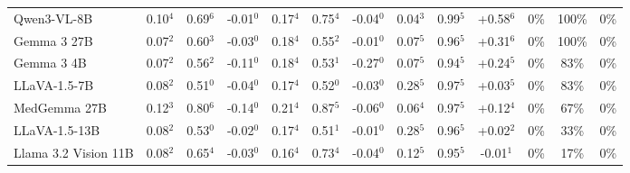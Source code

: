 \documentclass{article}
\begin{document}
\begin{table}[t]
{\begin{tabular}{l@{\hspace{3pt}}ccc@{\hspace{4pt}}ccc@{\hspace{4pt}}ccc@{\hspace{4pt}}ccc}
Qwen3-VL-8B & \cellcolor{cfSage2}0.10$^{4}$ & \cellcolor{cfSage2}0.69$^{6}$ & \cellcolor{cfSlate1}-0.01$^{0}$ & \cellcolor{cfSage3}0.17$^{4}$ & \cellcolor{cfSage2}0.75$^{4}$ & \cellcolor{cfSlate2}-0.04$^{0}$ & \cellcolor{cfSage1}0.04$^{3}$ & \cellcolor{cfSage4}0.99$^{5}$ & \cellcolor{cfTerra4}+0.58$^{6}$ & \cellcolor{cfTerra1}0\% & \cellcolor{cfTerra4}100\% & 0\% \\
Gemma 3 27B & \cellcolor{cfSage2}0.07$^{2}$ & \cellcolor{cfSage2}0.60$^{3}$ & \cellcolor{cfSlate2}-0.03$^{0}$ & \cellcolor{cfSage3}0.18$^{4}$ & \cellcolor{cfSage1}0.55$^{2}$ & \cellcolor{cfSlate1}-0.01$^{0}$ & \cellcolor{cfSage2}0.07$^{5}$ & \cellcolor{cfSage4}0.96$^{5}$ & \cellcolor{cfTerra4}+0.31$^{6}$ & \cellcolor{cfTerra1}0\% & \cellcolor{cfTerra4}100\% & 0\% \\
Gemma 3 4B & \cellcolor{cfSage2}0.07$^{2}$ & \cellcolor{cfSage1}0.56$^{2}$ & \cellcolor{cfSlate3}-0.11$^{0}$ & \cellcolor{cfSage3}0.18$^{4}$ & \cellcolor{cfSage1}0.53$^{1}$ & \cellcolor{cfSlate4}-0.27$^{0}$ & \cellcolor{cfSage2}0.07$^{5}$ & \cellcolor{cfSage4}0.94$^{5}$ & \cellcolor{cfTerra3}+0.24$^{5}$ & \cellcolor{cfTerra1}0\% & \cellcolor{cfTerra3}83\% & 0\% \\
LLaVA-1.5-7B & \cellcolor{cfSage2}0.08$^{2}$ & \cellcolor{cfSage1}0.51$^{0}$ & \cellcolor{cfSlate2}-0.04$^{0}$ & \cellcolor{cfSage3}0.17$^{4}$ & \cellcolor{cfSage1}0.52$^{0}$ & \cellcolor{cfSlate2}-0.03$^{0}$ & \cellcolor{cfSage4}0.28$^{5}$ & \cellcolor{cfSage4}0.97$^{5}$ & \cellcolor{cfTerra2}+0.03$^{5}$ & \cellcolor{cfTerra1}0\% & \cellcolor{cfTerra3}83\% & 0\% \\
MedGemma 27B & \cellcolor{cfSage3}0.12$^{3}$ & \cellcolor{cfSage3}0.80$^{6}$ & \cellcolor{cfSlate3}-0.14$^{0}$ & \cellcolor{cfSage4}0.21$^{4}$ & \cellcolor{cfSage3}0.87$^{5}$ & \cellcolor{cfSlate2}-0.06$^{0}$ & \cellcolor{cfSage2}0.06$^{4}$ & \cellcolor{cfSage4}0.97$^{5}$ & \cellcolor{cfTerra3}+0.12$^{4}$ & \cellcolor{cfTerra1}0\% & \cellcolor{cfTerra3}67\% & 0\% \\
LLaVA-1.5-13B & \cellcolor{cfSage2}0.08$^{2}$ & \cellcolor{cfSage1}0.53$^{0}$ & \cellcolor{cfSlate2}-0.02$^{0}$ & \cellcolor{cfSage3}0.17$^{4}$ & \cellcolor{cfSage1}0.51$^{1}$ & \cellcolor{cfSlate1}-0.01$^{0}$ & \cellcolor{cfSage4}0.28$^{5}$ & \cellcolor{cfSage4}0.96$^{5}$ & \cellcolor{cfTerra2}+0.02$^{2}$ & \cellcolor{cfTerra1}0\% & \cellcolor{cfTerra2}33\% & 0\% \\
Llama 3.2 Vision 11B & \cellcolor{cfSage2}0.08$^{2}$ & \cellcolor{cfSage2}0.65$^{4}$ & \cellcolor{cfSlate2}-0.03$^{0}$ & \cellcolor{cfSage3}0.16$^{4}$ & \cellcolor{cfSage2}0.73$^{4}$ & \cellcolor{cfSlate2}-0.04$^{0}$ & \cellcolor{cfSage3}0.12$^{5}$ & \cellcolor{cfSage4}0.95$^{5}$ & \cellcolor{cfSlate1}-0.01$^{1}$ & \cellcolor{cfTerra1}0\% & \cellcolor{cfTerra2}17\% & 0\% \\

\end{tabular}}
\end{table}
\end{document}
